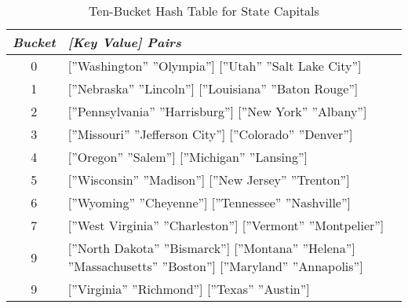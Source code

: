 \begin{table}
\begin{center}
\begin{tabular}{c|p{4in}}
\emph{Bucket} & \emph{[Key Value] Pairs} \\
\hline
0 & [''Washington'' ''Olympia'']  [''Utah''  ''Salt Lake City'']  \hfill{}  \hfill{} \\
\hline
1 & [''Nebraska''  ''Lincoln''] [''Louisiana''  ''Baton Rouge''] \hfill{} \\
\hline
2 & [''Pennsylvania''  ''Harrisburg'']  [''New York'' ''Albany''] \hfill{} \hfill{} \\
\hline
3 & [''Missouri''  ''Jefferson City'']  [''Colorado''  ''Denver''] \\
\hline
4 & [''Oregon''  ''Salem'']  [''Michigan''  ''Lansing''] \hfill{} \\
\hline
5 & [''Wisconsin'' ''Madison'']  [''New Jersey''  ''Trenton''] \hfill{} \hfill{} \\
\hline
6 & [''Wyoming''  ''Cheyenne'']  [''Tennessee''  ''Nashville''] \hfill{} \\
\hline
7 & [''West Virginia''  ''Charleston'']  [''Vermont''  ''Montpelier''] \hfill{} \hfill{} \hfill{} \\
\hline
9 & [''North Dakota''  ''Bismarck'']  [''Montana''  ''Helena''] \hfill\break
8''Massachusetts''  ''Boston'']  [''Maryland''  ''Annapolis''] \hfill{} \\
\hline
9 & [''Virginia''  ''Richmond'']  [''Texas'' ''Austin''] \hfill{} \hfill{} \\
\end{tabular}
\end{center}
\caption{Ten-Bucket Hash Table for State Capitals}
\label{table:hash-table-state-capitals}
\end{table}

